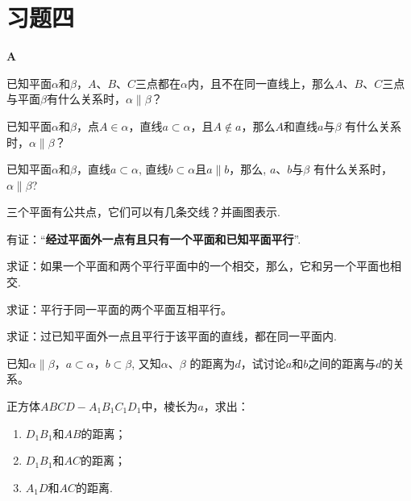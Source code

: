 \section*{习题四}
\begin{center}
    \bfseries A
\end{center}
\begin{enumerate}
    \item 已知平面$\alpha$和$\beta$，$A$、$B$、$C$三点都在$\alpha$内，且不在同一直线上，那么$A$、$B$、$C$三点与平面$\beta$有什么关系时，$\alpha\parallel \beta$？
   \item  已知平面$\alpha$和$\beta$，点$A\in\alpha$，直线$a\subset\alpha$，且$A\notin a$，那么$A$和直线$a$与$\beta$ 有什么关系时，$\alpha\parallel \beta$？
   \item  已知平面$\alpha$和$\beta$，直线$a\subset \alpha$, 直线$b\subset \alpha$且$a\parallel b$，那么, $a$、$b$与$\beta$ 有什么关系时，$\alpha\parallel \beta$?
   \item  三个平面有公共点，它们可以有几条交线？并画图表示.
   \item  有证：“\textbf{经过平面外一点有且只有一个平面和已知平面平行}”.
   \item  求证：如果一个平面和两个平行平面中的一个相交，那么，它和另一个平面也相交.
 \item  求证：平行于同一平面的两个平面互相平行。
   \item  求证：过已知平面外一点且平行于该平面的直线，都在同一平面内.
   \item  已知$\alpha\parallel \beta$，$a\subset\alpha$，$b\subset \beta$, 又知$\alpha$、$\beta$ 的距离为$d$，试讨论$a$和$b$之间的距离与$d$的关系。
   
   \noindent
   \begin{minipage}{.54\textwidth}
\item 正方体$ABCD-A_1B_1C_1D_1$中，棱长为$a$，求出：
\begin{enumerate}[(1)]
\item $D_1B_1$和$AB$的距离；
\item $D_1B_1$和$AC$的距离；
\item $A_1D$和$AC$的距离.
\end{enumerate}   
   \end{minipage}
   \hfill
   \begin{minipage}{.45\textwidth}
   \centering
   \end{minipage}
\end{enumerate}   

